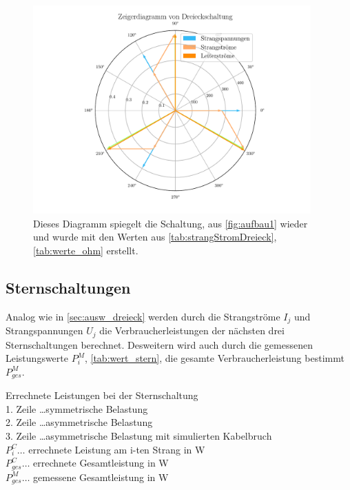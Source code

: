 \documentclass[12pt,english,ngerman]{scrartcl}
\begin{document}
\begin{figure}[H]
	\begin{center}
		\includegraphics[width = 0.95\textwidth]{figures/zeigerDreieck.pdf}
	\end{center}
	\caption[Zeigerdiagramm einer sysmetrisch ohmsch-belastete Dreiecksschaltung]{ Dieses
		Diagramm spiegelt die Schaltung, aus \autoref{fig:aufbau1} wieder und wurde mit
		den Werten aus \autoref{tab:strangStromDreieck}, \autoref{tab:werte_ohm}
		erstellt.
	}\label{fig:zeigerDreieck}
\end{figure}

\subsection{Sternschaltungen}\label{sec:aus_stern}

Analog wie in \autoref{sec:ausw_dreieck} werden durch die Strangströme $I_j$
und Strangspannungen $U_j$ die Verbraucherleistungen der nächsten drei
Sternschaltungen berechnet. Desweitern wird auch durch die gemessenen
Leistungswerte $P_i^M$, \autoref{tab:wert_stern}, die gesamte
Verbraucherleistung bestimmt $P_{ges}^{M}$.

\begin{table}[H]
	\caption[Errechnete Leistungen bei der Sternschaltung]{Errechnete Leistungen bei der
		Sternschaltung                                                    \\
		1. Zeile \dots symmetrische Belastung                             \\
		2. Zeile \dots asymmetrische Belastung                            \\
		3. Zeile \dots asymmetrische Belastung mit simulierten Kabelbruch \\
		$P_i^C \dots$ errechnete Leistung am i-ten Strang in W            \\
		$P_{ges}^C \dots$ errechnete Gesamtleistung in W                  \\
		$P_{ges}^M \dots$ gemessene Gesamtleistung in W
	}\label{tab:powerStern}
	\centering
	
\end{table}
\end{document}
